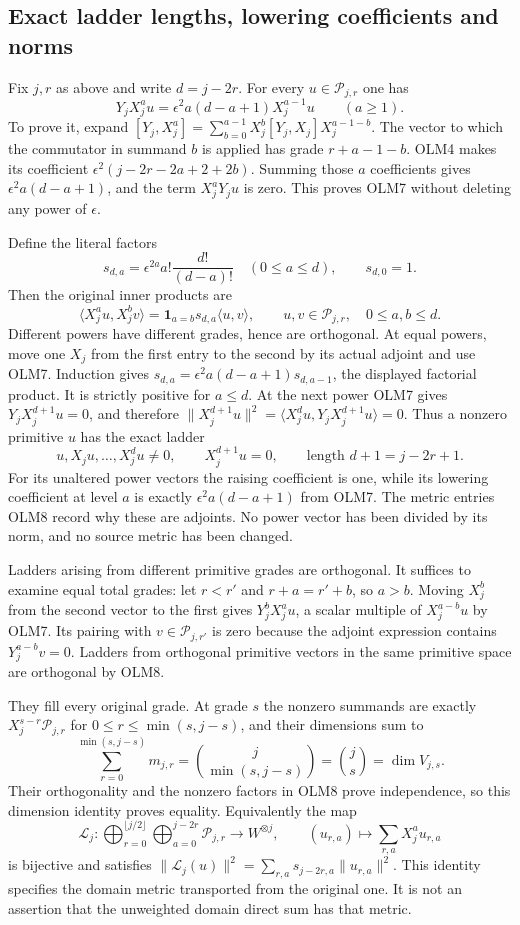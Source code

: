 \subsection{Exact ladder lengths, lowering coefficients and norms}

Fix $j,r$ as above and write $d=j-2r$.
For every $u\in\mathcal P_{j,r}$ one has
\[
Y_jX_j^a u=\epsilon^2a(d-a+1)X_j^{a-1}u
\qquad(a\ge1).
\tag{OLM7}
\]
To prove it, expand
$[Y_j,X_j^a]=\sum_{b=0}^{a-1}X_j^b[Y_j,X_j]X_j^{a-1-b}$.
The vector to which the commutator in summand $b$ is applied
has grade $r+a-1-b$. OLM4 makes its coefficient
$\epsilon^2(j-2r-2a+2+2b)$.
Summing those $a$ coefficients gives
$\epsilon^2a(d-a+1)$, and the term $X_j^aY_ju$ is zero.
This proves OLM7 without deleting any power of $\epsilon$.

Define the literal factors
\[
s_{d,a}=\epsilon^{2a}a!\frac{d!}{(d-a)!}
\quad(0\le a\le d),\qquad s_{d,0}=1.
\]
Then the original inner products are
\[
\boxed{
\langle X_j^a u,X_j^b v\rangle
 =\mathbf1_{a=b}s_{d,a}\langle u,v\rangle,
\qquad u,v\in\mathcal P_{j,r},\quad0\le a,b\le d.}
\tag{OLM8}
\]
Different powers have different grades, hence are orthogonal.
At equal powers, move one $X_j$ from the first entry to the
second by its actual adjoint and use OLM7. Induction gives
$s_{d,a}=\epsilon^2a(d-a+1)s_{d,a-1}$, the displayed factorial
product. It is strictly positive for $a\le d$.
At the next power OLM7 gives $Y_jX_j^{d+1}u=0$, and therefore
$\|X_j^{d+1}u\|^2=\langle X_j^d u,Y_jX_j^{d+1}u\rangle=0$.
Thus a nonzero primitive $u$ has the exact ladder
\[
u,X_ju,\ldots,X_j^du\ne0,\qquad X_j^{d+1}u=0,
\qquad\text{length }d+1=j-2r+1.
\tag{OLM9}
\]
For its unaltered power vectors the raising coefficient is one,
while its lowering coefficient at level $a$ is exactly
$\epsilon^2a(d-a+1)$ from OLM7. The metric entries OLM8 record
why these are adjoints. No power vector has been divided by
its norm, and no source metric has been changed.

Ladders arising from different primitive grades are orthogonal.
It suffices to examine equal total grades: let $r<r'$ and
$r+a=r'+b$, so $a>b$. Moving $X_j^b$ from the second vector
to the first gives $Y_j^bX_j^a u$, a scalar multiple of
$X_j^{a-b}u$ by OLM7. Its pairing with
$v\in\mathcal P_{j,r'}$ is zero because the adjoint expression
contains $Y_j^{a-b}v=0$. Ladders from orthogonal primitive
vectors in the same primitive space are orthogonal by OLM8.

They fill every original grade. At grade $s$ the nonzero summands
are exactly $X_j^{s-r}\mathcal P_{j,r}$ for
$0\le r\le\min(s,j-s)$, and their dimensions sum to
\[
\sum_{r=0}^{\min(s,j-s)}m_{j,r}
=\binom j{\min(s,j-s)}=\binom js=\dim V_{j,s}.
\tag{OLM10}
\]
Their orthogonality and the nonzero factors in OLM8 prove
independence, so this dimension identity proves equality.
Equivalently the map
\[
\mathcal L_j:
\bigoplus_{r=0}^{\lfloor j/2\rfloor}
    \bigoplus_{a=0}^{j-2r}\mathcal P_{j,r}
\longrightarrow W^{\otimes j},\qquad
(u_{r,a})\longmapsto\sum_{r,a}X_j^a u_{r,a}
\tag{OLM11}
\]
is bijective and satisfies
$\|\mathcal L_j(u)\|^2=\sum_{r,a}s_{j-2r,a}\|u_{r,a}\|^2$.
This identity specifies the domain metric transported from the
original one. It is not an assertion that the unweighted domain
direct sum has that metric.

